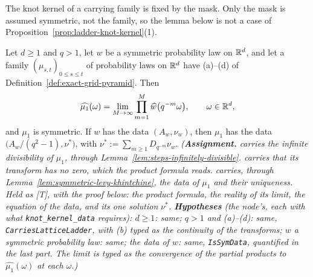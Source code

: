 The knot kernel of a carrying family is fixed by the mask. Only the mask is assumed symmetric,
not the family, so the lemma below is not a case of Proposition~\ref{prop:ladder-knot-kernel}(1).

\begin{lemma}
\label{lem:knot-data}
\leanok
{}
Let $d \ge 1$ and $q > 1$, let $w$ be a symmetric probability law on $\mathbb{R}^d$, and let a family
$(\mu_{s,t})_{0 \le s \le t}$ of probability laws on $\mathbb{R}^d$ have (a)--(d) of
Definition~\ref{def:exact-grid-pyramid}. Then
\[
  \widehat{\mu_1}(\omega) = \lim_{M \to \infty}\prod_{m=1}^M\widehat{w}\bigl(q^{-m}\omega\bigr),
  \qquad \omega \in \mathbb{R}^d,
\]
and $\mu_1$ is symmetric. If $w$ has the \Levy{} data $(A_w, \nu_w)$, then $\mu_1$ has the data
$\bigl(A_w/(q^2 - 1), \nu^*\bigr)$, with $\nu^* := \sum_{m \ge 1}D_{q^{-m}}\nu_w$.
\statusA\quad{}\quad{}\quad{}\quad\emph{(\textbf{Assignment.}
 carries the infinite divisibility of $\mu_1$, through
Lemma~\ref{lem:steps-infinitely-divisible}.  carries that its transform has no zero,
which the product formula reads.  carries, through
Lemma~\ref{lem:symmetric-levy-khintchine}, the data of $\mu_1$ and their uniqueness. Held as [T],
with the proof below: the product formula, the reality of its limit, the equation of the data, and
its one solution $\nu^*$. \textbf{Hypotheses} (the node's, each with what \texttt{knot\_kernel\_data}
requires): $d \ge 1$: same; $q > 1$ and (a)--(d): same, \texttt{CarriesLatticeLadder}, with (b)
typed as the continuity of the transforms; $w$ a symmetric probability law: same; the data of $w$:
same, \texttt{IsSymData}, quantified in the last part. The limit is typed as the convergence of the
partial products to $\widehat{\mu_1}(\omega)$ at each $\omega$.)}
\end{lemma}

